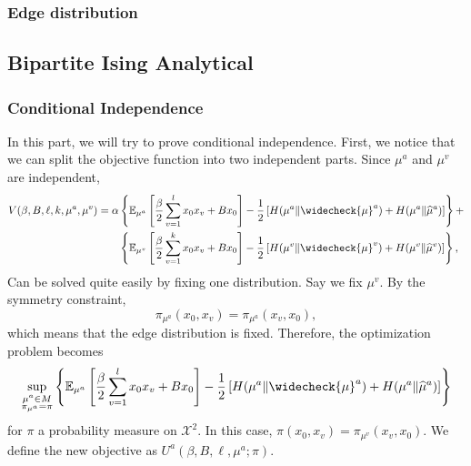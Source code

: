 \documentclass[12pt]{article}
\numberwithin{equation}{section}
\begin{document}
\newpage

\subsubsection{Edge distribution}

\subsection{Bipartite Ising Analytical}

\subsubsection{Conditional Independence}

In this part, we will try to prove conditional independence. First, we notice that we can split the objective function into two independent parts.
Since $\mu^a$ and $\mu^v$ are independent,
\begin{equation}
    \begin{aligned}
        V(\beta, B, \ell, k, \mu^a, \mu^v) = \alpha & \left\{\mathbb{E}_{\mu^a}\left[\frac\beta2\sum_{v=1}^l x_0x_v + B x_0\right]
        - \frac12\left[H(\mu^a\|\widecheck{\mu}^a)+H(\mu^a\|\widehat{\mu}^a)\right]\right\} +                                      \\
                                                    & \left\{\mathbb{E}_{\mu^v}\left[\frac\beta2\sum_{v=1}^k x_0x_v + B x_0\right]
        - \frac12\left[H(\mu^v\|\widecheck{\mu}^v)+H(\mu^v\|\widehat{\mu}^v)\right]\right\},
    \end{aligned}
\end{equation}
Can be solved quite easily by fixing one distribution.
Say we fix $\mu^v$. By the symmetry constraint,
\begin{equation*}
    \pi_{\mu^a}(x_0, x_v) = \pi_{\mu^a}(x_v, x_0),
\end{equation*}
which means that the edge distribution is fixed. Therefore, the optimization problem becomes
\begin{equation}
    \sup_{\substack{\mu^a\in M \\ \pi_{\mu^a}=\pi}} \left\{\mathbb{E}_{\mu^a}\left[\frac\beta2\sum_{v=1}^l x_0x_v + B x_0\right]
    - \frac12\left[H(\mu^a\|\widecheck{\mu}^a)+H(\mu^a\|\widehat{\mu}^a)\right]\right\}
\end{equation}
for $\pi$ a probability measure on $\mathcal{X}^2$. In this case, $\pi(x_0, x_v) = \pi_{\mu^v}(x_v, x_0)$. We define the new objective as $U^a(\beta, B, \ell, \mu^a; \pi)$.
\end{document}
